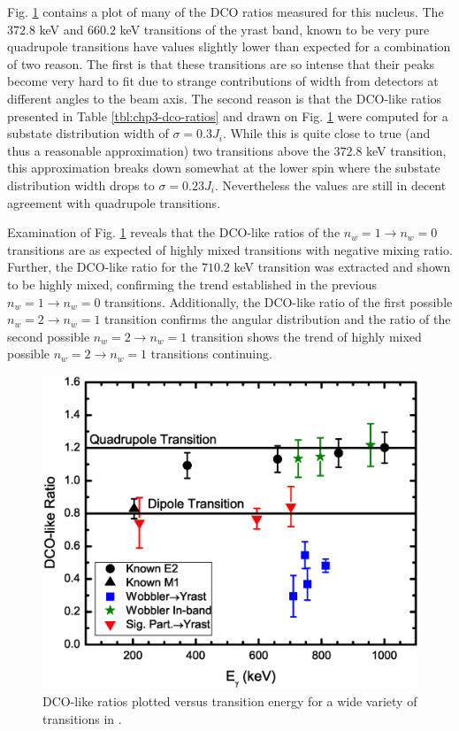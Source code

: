 Fig. \ref{fig:chp4-dco} contains a plot of many of the DCO ratios measured for this nucleus. The $372.8$ keV and $660.2$ keV transitions of the yrast band, known to be very pure quadrupole transitions have values slightly lower than expected for a combination of two reason. The first is that these transitions are so intense that their peaks become very hard to fit due to strange contributions of width from detectors at different angles to the beam axis. The second reason is that the DCO-like ratios presented in Table \ref{tbl:chp3-dco-ratios} and drawn on Fig. \ref{fig:chp4-dco} were computed for a substate distribution width of $\sigma{}=0.3J_i$. While this is quite close to true (and thus a reasonable approximation) two transitions above the $372.8$ keV transition, this approximation breaks down somewhat at the lower spin where the substate distribution width drops to $\sigma{}=0.23J_i$. Nevertheless the values are still in decent agreement with quadrupole transitions.

Examination of Fig. \ref{fig:chp4-dco} reveals that the DCO-like ratios of the $n_w=1\rightarrow{}n_w=0$ transitions are as expected of highly mixed transitions with negative mixing ratio. Further, the DCO-like ratio for the $710.2$ keV transition was extracted and shown to be highly mixed, confirming the trend established in the previous $n_w=1\rightarrow{}n_w=0$ transitions. Additionally, the DCO-like ratio of the first possible $n_w=2\rightarrow{}n_w=1$ transition confirms the angular distribution and the ratio of the second possible $n_w=2\rightarrow{}n_w=1$ transition shows the trend of highly mixed possible $n_w=2\rightarrow{}n_w=1$ transitions continuing.

\begin{figure}[t!]
\centerline{\includegraphics[width=\textwidth]{./img/c4/DCO.eps}}
	\caption{DCO-like ratios plotted versus transition energy for a wide variety of transitions in \pr{}.\label{fig:chp4-dco}}
\end{figure}

